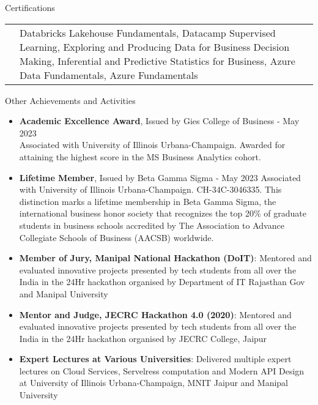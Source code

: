 \documentclass{resume} %
\makeatletter
\newcommand{\entry}[2]{#1 & #2 \tabularnewline} %
\newcommand{\tableEnv}[2]{%
    \begin{rSection}{#1} %
        \begin{adjustwidth}{0.0in}{0.1in} %
            \begin{tabularx}{\linewidth}{@{} >{\bfseries}l @{\hspace{6ex}} X @{}}
                #2 %
            \end{tabularx}
        \end{adjustwidth}
    \end{rSection}
}
\makeatother
\begin{document}
    
    \tableEnv{Certifications}{
        \entry{}{Databricks Lakehouse Fundamentals, Datacamp Supervised Learning, Exploring and Producing Data for Business Decision Making, Inferential and Predictive Statistics for Business, Azure Data Fundamentals, Azure Fundamentals}
    }
    
    
    
    \begin{rSection}{Other Achievements and Activities}
        \begin{itemize}
            \item \textbf{Academic Excellence Award}, Issued by Gies College of Business - May 2023 \\
            Associated with University of Illinois Urbana-Champaign. Awarded for attaining the highest score in the MS Business Analytics cohort.
            \item \textbf{Lifetime Member}, Issued by Beta Gamma Sigma - May 2023 Associated with University of Illinois Urbana-Champaign. CH-34C-3046335. This distinction marks a lifetime membership in Beta Gamma Sigma, the international business honor society that recognizes the top 20\% of graduate students in business schools accredited by The Association to Advance Collegiate Schools of Business (AACSB) worldwide.
            \item \textbf{Member of Jury, Manipal National Hackathon (DoIT)}: Mentored and evaluated innovative projects presented by tech students from all over the India in the 24Hr hackathon organised by Department of IT Rajasthan Gov and Manipal University
            \item \textbf{Mentor and Judge, JECRC Hackathon 4.0 (2020)}: Mentored and evaluated innovative projects presented by tech students from all over the India in the 24Hr hackathon organised by JECRC College, Jaipur
            \item \textbf{Expert Lectures at Various Universities}: Delivered multiple expert lectures on Cloud Services, Servelress computation and Modern API Design at University of Illinois Urbana-Champaign, MNIT Jaipur and Manipal University

\end{itemize}
\end{rSection}
\end{document}

